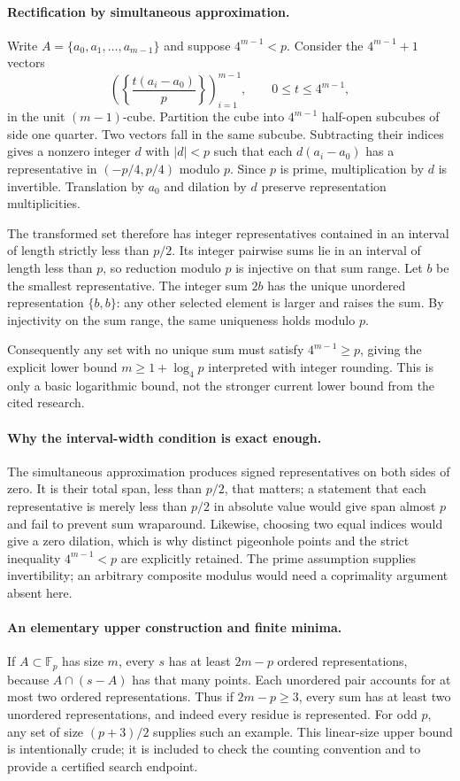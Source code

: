 \documentclass[11pt,a4paper]{article}
\newcommand{\F}{\mathbb{F}}
\begin{document}
\paragraph{Rectification by simultaneous approximation.}
Write $A=\{a_0,a_1,\ldots,a_{m-1}\}$ and suppose $4^{m-1}<p$. Consider the $4^{m-1}+1$ vectors
\[
 \left(\left\{\frac{t(a_i-a_0)}p\right\}\right)_{i=1}^{m-1},
 \qquad 0\leq t\leq4^{m-1},
\]
in the unit $(m-1)$-cube. Partition the cube into $4^{m-1}$ half-open subcubes of side one quarter. Two vectors fall in the same subcube. Subtracting their indices gives a nonzero integer $d$ with $|d|<p$ such that each $d(a_i-a_0)$ has a representative in $(-p/4,p/4)$ modulo $p$. Since $p$ is prime, multiplication by $d$ is invertible. Translation by $a_0$ and dilation by $d$ preserve representation multiplicities.

The transformed set therefore has integer representatives contained in an interval of length strictly less than $p/2$. Its integer pairwise sums lie in an interval of length less than $p$, so reduction modulo $p$ is injective on that sum range. Let $b$ be the smallest representative. The integer sum $2b$ has the unique unordered representation $\{b,b\}$: any other selected element is larger and raises the sum. By injectivity on the sum range, the same uniqueness holds modulo $p$.

Consequently any set with no unique sum must satisfy $4^{m-1}\geq p$, giving the explicit lower bound $m\geq1+\log_4p$ interpreted with integer rounding. This is only a basic logarithmic bound, not the stronger current lower bound from the cited research.

\paragraph{Why the interval-width condition is exact enough.}
The simultaneous approximation produces signed representatives on both sides of zero. It is their total span, less than $p/2$, that matters; a statement that each representative is merely less than $p/2$ in absolute value would give span almost $p$ and fail to prevent sum wraparound. Likewise, choosing two equal indices would give a zero dilation, which is why distinct pigeonhole points and the strict inequality $4^{m-1}<p$ are explicitly retained. The prime assumption supplies invertibility; an arbitrary composite modulus would need a coprimality argument absent here.

\paragraph{An elementary upper construction and finite minima.}
If $A\subset\F_p$ has size $m$, every $s$ has at least $2m-p$ ordered representations, because $A\cap(s-A)$ has that many points. Each unordered pair accounts for at most two ordered representations. Thus if $2m-p\geq3$, every sum has at least two unordered representations, and indeed every residue is represented. For odd $p$, any set of size $(p+3)/2$ supplies such an example. This linear-size upper bound is intentionally crude; it is included to check the counting convention and to provide a certified search endpoint.
\end{document}
